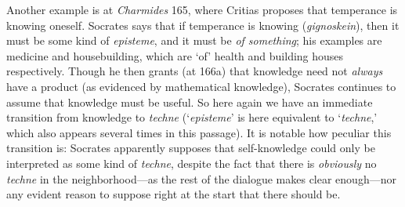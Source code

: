 ﻿\documentclass[11pt]{amsart}
\begin{document}
Another example is at \emph{Charmides} 165, where Critias proposes that temperance is knowing oneself. Socrates says that if temperance is knowing (\emph{gignoskein}), then it must be some kind of \emph{episteme}, and it must be \emph{of something}; his examples are medicine and housebuilding, which are `of' health and building houses respectively. Though he then grants (at 166a) that knowledge need not \emph{always} have a product (as evidenced by mathematical knowledge), Socrates continues to assume that knowledge must be useful. So here again we have an immediate transition from knowledge to \emph{techne} (`\emph{episteme}' is here equivalent to `\emph{techne},' which also appears several times in this passage). It is notable how peculiar this transition is: Socrates apparently supposes that self-knowledge could only be interpreted as some kind of \emph{techne}, despite the fact that there is \emph{obviously} no \emph{techne} in the neighborhood---as the rest of the dialogue makes clear enough---nor any evident reason to suppose right at the start that there should be.
\end{document}
